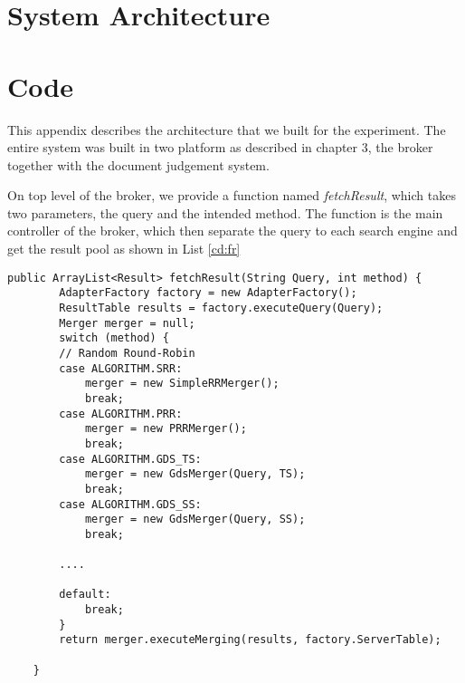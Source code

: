 \appendix
{}
\chapter{System Architecture} 


\chapter{Code}
This appendix describes the architecture that we built for the experiment. The entire system was built in two platform as described in chapter 3, the broker together with the document judgement system.

On top level of the broker, we provide a function named \textit{fetchResult}, which takes two parameters, the query and the intended method. The function is the main controller of the broker, which then separate the query to each search engine and get the result pool as shown in List \ref{cd:fr}

\lstset{escapechar=@,style=customc}
\begin{lstlisting}[caption={Code for getting ranking result},label=cd:fr]
public ArrayList<Result> fetchResult(String Query, int method) {
		AdapterFactory factory = new AdapterFactory();
		ResultTable results = factory.executeQuery(Query);
		Merger merger = null;
		switch (method) {
		// Random Round-Robin
		case ALGORITHM.SRR:
			merger = new SimpleRRMerger();
			break;
		case ALGORITHM.PRR:
			merger = new PRRMerger();
			break;
		case ALGORITHM.GDS_TS:
			merger = new GdsMerger(Query, TS);
			break;
		case ALGORITHM.GDS_SS:
			merger = new GdsMerger(Query, SS);
			break;
	
		....		
		
		default:
			break;
		}
		return merger.executeMerging(results, factory.ServerTable);

	}
\end{lstlisting}

